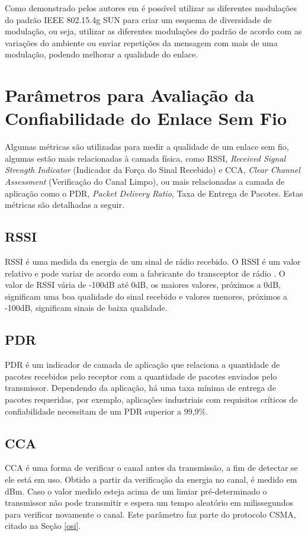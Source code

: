 Como demonstrado pelos autores em \cite{gomes2020improving} é possível utilizar as diferentes modulações do padrão IEEE 802.15.4g SUN para criar um esquema de diversidade de modulação, ou seja, utilizar as diferentes modulações do padrão de acordo com as variações do ambiente ou enviar repetições da mensagem com mais de uma modulação, podendo melhorar a qualidade do enlace.

\section{Parâmetros para Avaliação da Confiabilidade do Enlace Sem Fio}
\label{paramSF}
Algumas métricas são utilizadas para medir a qualidade de um enlace sem fio, algumas estão mais relacionadas à camada física, como RSSI, \emph{Received Signal Strength Indicator} (Indicador da Força do Sinal Recebido) e CCA, \emph{Clear Channel Assessment} (Verificação do Canal Limpo), ou mais relacionadas a camada de aplicação como o PDR, \emph{Packet Delivery Ratio}, Taxa de Entrega de Pacotes. Estas métricas são detalhadas a seguir.

\subsection*{RSSI}
RSSI é uma medida da energia de um sinal de rádio recebido. O RSSI é um valor relativo e pode variar de acordo com a fabricante do transceptor de rádio \cite{UNDERSTANDING_RSSI}. O valor de RSSI vária de -100dB até 0dB, os maiores valores, próximos a 0dB, significam uma boa qualidade do sinal recebido e valores menores, próximos a -100dB, significam sinais de baixa qualidade.

\subsection*{PDR}
PDR é um indicador de camada de aplicação que relaciona a quantidade de pacotes recebidos pelo receptor com a quantidade de pacotes enviados pelo transmissor. Dependendo da aplicação, há uma taxa mínima de entrega de pacotes requeridas, por exemplo, aplicações industriais com requisitos críticos de confiabilidade necessitam de um PDR superior a 99,9\%.

\subsection*{CCA}
CCA é uma forma de verificar o canal antes da transmissão, a fim de detectar se ele está em uso. Obtido a partir da verificação da energia no canal, é medido em dBm. Caso o valor medido esteja acima de um limiar pré-determinado o transmissor não pode transmitir e espera um tempo aleatório em milissegundos para verificar novamente o canal. Este parâmetro faz parte do protocolo CSMA, citado na Seção \ref{osi}.

